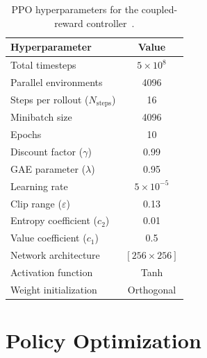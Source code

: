 \begin{table}[htbp]
\centering
\caption{PPO hyperparameters for the coupled-reward controller~\citep{sk2025diktracking}.}
\label{tab:dikppo_hyper}
\begin{tabular}{lc}
\toprule
\textbf{Hyperparameter} & \textbf{Value} \\
\midrule
Total timesteps            & $5 \times 10^8$ \\
Parallel environments      & 4096 \\
Steps per rollout ($N_{\text{steps}}$) & 16 \\
Minibatch size              & 4096 \\
Epochs                      & 10 \\
Discount factor ($\gamma$)  & 0.99 \\
GAE parameter ($\lambda$)   & 0.95 \\
Learning rate                & $5 \times 10^{-5}$ \\
Clip range ($\varepsilon$)      & 0.13 \\
Entropy coefficient ($c_2$)  & 0.01 \\
Value coefficient ($c_1$)    & 0.5 \\
Network architecture         & $[256 \times 256]$ \\
Activation function           & Tanh \\
Weight initialization          & Orthogonal \\
\bottomrule
\end{tabular}
\end{table}

\section{Policy Optimization}\label{sec:dikppo_ppo}

